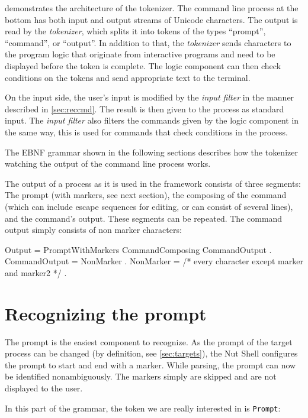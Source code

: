 \documentclass[paper=a4,twoside,abstract=on,cleardoublepage=empty,numbers=noenddot,toc=bib,toc=listof,12pt,appendixprefix=true]{scrreprt}
\begin{document}
 demonstrates the architecture of the tokenizer. The command line process at the bottom has both input and output streams of Unicode characters. The output is read by the \emph{tokenizer}, which splits it into tokens of the types “prompt”, “command”, or “output”. In addition to that, the \emph{tokenizer} sends characters to the program logic that originate from interactive programs and need to be displayed before the token is complete. The logic component can then check conditions on the tokens and send appropriate text to the terminal.

On the input side, the user's input is modified by the \emph{input filter} in the manner described in \cref{sec:reccmd}. The result is then given to the process as standard input. The \emph{input filter} also filters the commands given by the logic component in the same way, this is used for commands that check conditions in the process.

The EBNF grammar shown in the following sections describes how the tokenizer watching the output of the command line process works.

The output of a process as it is used in the framework consists of three segments: The prompt (with markers, see next section), the composing of the command (which can include escape sequences for editing, or can consist of several lines), and the command's output. These segments can be repeated. The command output simply consists of non marker characters:

\begin{ebnf}
Output = { PromptWithMarkers CommandComposing CommandOutput } .
CommandOutput = { NonMarker } .
NonMarker = /* every character except marker and marker2 */ .
\end{ebnf}

\section{Recognizing the prompt}

The prompt is the easiest component to recognize. As the prompt of the target process can be changed (by definition, see \cref{sec:targets}), the Nut Shell configures the prompt to start and end with a marker. While parsing, the prompt can now be identified nonambiguously. The markers simply are skipped and are not displayed to the user.

In this part of the grammar, the token we are really interested in is \texttt{Prompt}:
\end{document}
